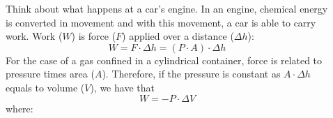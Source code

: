 \documentclass[main.tex]{subfiles}
\begin{document}
\begin{description}
\item[] 
Think about what happens at a car's engine. In an engine, chemical energy is converted in movement and with this movement, a car is able to carry work. Work ($W$) is force ($F$) applied over a distance ($\Delta h$):
\begin{equation*}
    W = F\cdot \Delta h    = (P\cdot A) \cdot \Delta h
\end{equation*}
For the case of a gas confined in a cylindrical container, force is related to pressure times area ($A$). Therefore, if the pressure is constant as $A\cdot \Delta h$ equals to volume ($V$), we have that
\begin{equation}
\boxed{   W = -P\cdot \Delta V   }
\label{formula2:92}
\end{equation}
where:


\end{description}
\end{document}
